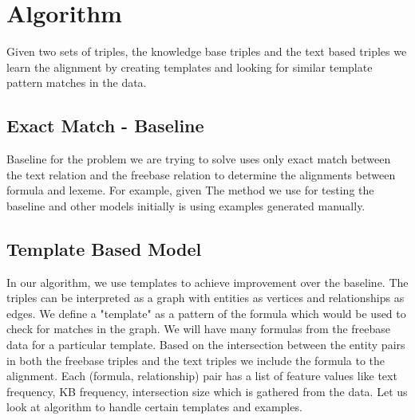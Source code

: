 \documentclass[12pt, a4paper]{article}
\begin{document}
\section{Algorithm}
Given two sets of triples, the knowledge base triples and the text based triples we learn the alignment by creating templates and looking for similar template pattern matches in the data.\\

\subsection{Exact Match - Baseline}
Baseline for the problem we are trying to solve uses only exact match between the text relation and the freebase relation to determine the alignments between formula and lexeme. For example, given The method we use for testing the baseline and other models initially is using examples generated manually. 

\subsection{Template Based Model}
In our algorithm, we use templates to achieve improvement over the baseline. The triples can be interpreted as a graph with entities as vertices and relationships as edges. We define a "template" as a pattern of the formula which would be used to check for matches in the graph. We will have many formulas from the freebase data for a particular template. Based on the intersection between the entity pairs in both the freebase triples and the text triples we include the formula to the alignment. Each (formula, relationship) pair has a list of feature values like text frequency, KB frequency, intersection size which is gathered from the data. Let us look at algorithm to handle certain templates and examples.\\
\end{document}
